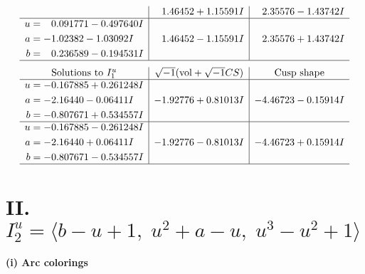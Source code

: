 \documentclass[1p]{elsarticle_modified}
\theoremstyle{definition}
\newcommand{\I}{\sqrt{-1}}
\begin{document}
$$\begin{array}{c|c|c}
 & \phantom{-}1.46452 + 1.15591 I & \phantom{-}2.35576 - 1.43742 I \\ \hline\begin{aligned}
u &= \phantom{-}0.091771 - 0.497640 I \\
a &= -1.02382 - 1.03092 I \\
b &= \phantom{-}0.236589 - 0.194531 I\end{aligned}
 & \phantom{-}1.46452 - 1.15591 I & \phantom{-}2.35576 + 1.43742 I\\
 \hline 
 \end{array}$$\newpage$$\begin{array}{c|c|c}  
\text{Solutions to }I^u_{1}& \I (\text{vol} + \sqrt{-1}CS) & \text{Cusp shape}\\
 \hline 
\begin{aligned}
u &= -0.167885 + 0.261248 I \\
a &= -2.16440 - 0.06411 I \\
b &= -0.807671 + 0.534557 I\end{aligned}
 & -1.92776 + 0.81013 I & -4.46723 - 0.15914 I \\ \hline\begin{aligned}
u &= -0.167885 - 0.261248 I \\
a &= -2.16440 + 0.06411 I \\
b &= -0.807671 - 0.534557 I\end{aligned}
 & -1.92776 - 0.81013 I & -4.46723 + 0.15914 I\\
 \hline 
 \end{array}$$\newpage\newpage\renewcommand{\arraystretch}{1}
\centering \section*{II. $I^u_{2}= \langle b- u+1,\;u^2+a- u,\;u^3- u^2+1 \rangle$}
\flushleft \textbf{(i) Arc colorings}\\
\end{document}
